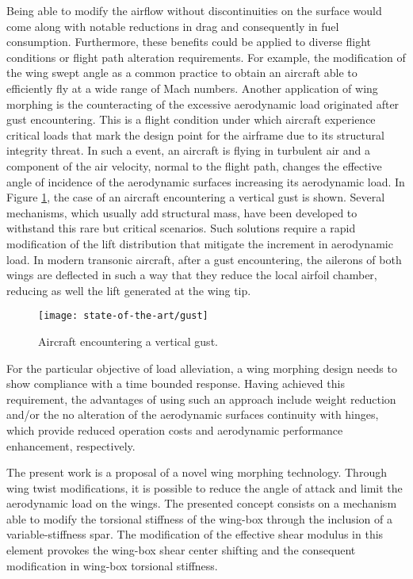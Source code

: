 Being able to modify the airflow without discontinuities on the surface would come along with notable reductions in drag and consequently in fuel consumption. Furthermore, these benefits could be applied to diverse flight conditions or flight path alteration requirements. For example, the modification of the wing swept angle as a common practice to obtain an aircraft able to efficiently fly at a wide range of Mach numbers. Another application of wing morphing is the counteracting of the excessive aerodynamic load originated after gust encountering. This is a flight condition under which aircraft experience critical loads that mark the design point for the airframe due to its structural integrity threat. In such a event, an aircraft is flying in turbulent air and a component of the air velocity, normal to the flight path, changes the effective angle of incidence of the aerodynamic surfaces increasing its aerodynamic load. In Figure \ref{fig:gust}, the case of an aircraft encountering a vertical gust is shown. Several mechanisms, which usually add structural mass, have been developed to withstand this rare but critical scenarios. Such solutions require a rapid modification of the lift distribution that mitigate the increment in aerodynamic load. In modern transonic aircraft, after a gust encountering, the ailerons of both wings are deflected in such a way that they reduce the local airfoil chamber, reducing as well the lift generated at the wing tip.

\begin{figure}[!htpb]
  \centering
  \texttt{[image: state-of-the-art/gust]}
  \caption[Aircraft encountering a vertical gust]{Aircraft encountering a vertical gust. \cite{JECooper2007}}\label{fig:gust}
\end{figure}

For the particular objective of load alleviation, a wing morphing design needs to show compliance with a time bounded response. Having achieved this requirement, the advantages of using such an approach include weight reduction and/or the no alteration of the aerodynamic surfaces continuity with hinges, which provide reduced operation costs and aerodynamic performance enhancement, respectively.

The present work is a proposal of a novel wing morphing technology. Through wing twist modifications, it is possible to reduce the angle of attack and limit the aerodynamic load on the wings. The presented concept consists on a mechanism able to modify the torsional stiffness of the wing-box through the inclusion of a variable-stiffness spar. The modification of the effective shear modulus in this element provokes the wing-box shear center shifting and the consequent modification in wing-box torsional stiffness. 

